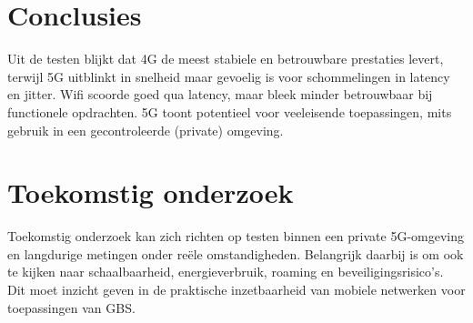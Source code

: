 \documentclass[a0,portrait]{hogent-poster}
\begin{document}
\begin{multicols}{2}
\section{Conclusies}
Uit de testen blijkt dat 4G de meest stabiele en betrouwbare prestaties levert, terwijl 5G uitblinkt in snelheid maar gevoelig is voor schommelingen in latency en jitter. Wifi scoorde goed qua latency, maar bleek minder betrouwbaar bij functionele opdrachten. 5G toont potentieel voor veeleisende toepassingen, mits gebruik in een gecontroleerde (private) omgeving.

\section{Toekomstig onderzoek}

Toekomstig onderzoek kan zich richten op testen binnen een private 5G-omgeving en langdurige metingen onder reële omstandigheden. Belangrijk daarbij is om ook te kijken naar schaalbaarheid, energieverbruik, roaming en beveiligingsrisico’s. Dit moet inzicht geven in de praktische inzetbaarheid van mobiele netwerken voor toepassingen van GBS. 

\end{multicols}
\end{document}
